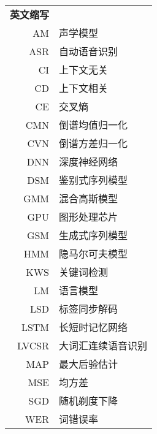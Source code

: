 \begin{longtable}{rl}
\textbf{英文缩写} \\
AM & 声学模型 \\
ASR & 自动语音识别 \\
CI & 上下文无关 \\
CD & 上下文相关 \\
CE & 交叉熵 \\
CMN & 倒谱均值归一化 \\
CVN & 倒谱方差归一化 \\
DNN & 深度神经网络 \\
DSM & 鉴别式序列模型 \\
GMM & 混合高斯模型 \\
GPU & 图形处理芯片 \\
GSM & 生成式序列模型 \\
HMM & 隐马尔可夫模型 \\
KWS & 关键词检测 \\
LM & 语言模型 \\
LSD & 标签同步解码 \\
LSTM & 长短时记忆网络 \\
LVCSR & 大词汇连续语音识别 \\
MAP & 最大后验估计 \\
MSE & 均方差 \\
SGD & 随机剃度下降 \\
WER & 词错误率 \\
\end{longtable}
